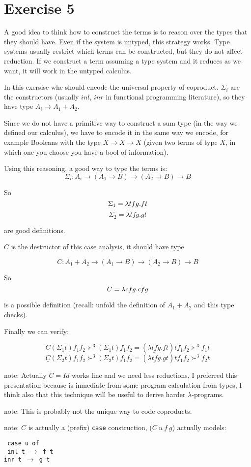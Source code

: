 
\section*{Exercise 5}

A good idea to think how to construct the terms is to reason over the
types that they should have. Even if the system is untyped, this
strategy works. Type systems usually restrict which terms can be constructed,
but they do not affect reduction. If we construct a term assuming a type
system and it reduces as we want, it will work in the untyped calculus.

In this exersise whe should encode the universal property of coproduct.
$\Sigma_i$ are the constructors (usually $inl$, $inr$ in functional
programming literature), so they have type $A_i \rightarrow A_1 + A_2$.

Since we do not have a primitive way to construct a sum type (in the way
we defined our calculus), we have to encode it in
the same way we encode, for example Booleans with the type
$ X \rightarrow X \rightarrow X$ (given two terms of type $X$,
in which one you choose you have a bool of information).

Using this reasoning, a good way to type the terms is:
$$\Sigma_i : A_i \rightarrow
            (A_1 \rightarrow B) \rightarrow
            (A_2 \rightarrow B) \rightarrow
            B
$$


So
$$
    \Sigma_1 = \lambda t f g . f t \\
$$
$$
    \Sigma_2 = \lambda t f g . g t
$$

are good definitions.

$C$ is the destructor of this case analysis, it should have type

$$
    C : A_1 + A_2 \rightarrow
       (A_1 \rightarrow B) \rightarrow
       (A_2 \rightarrow B) \rightarrow
       B
$$

So
$$
     C = \lambda c f g . c f g \\
$$

is a possible definition (recall: unfold the definition of $A_1 + A_2$
and this type checks).

Finally we can verify:

$$
    \underline{C} (\Sigma_1 t) f_1 f_2
    \succ^{3}  (\Sigma_1 t) f_1 f_2
    = (\underline{\lambda t f g} . f t) t f_1 f_2
    \succ^{3} f_1 t
$$
$$
    \underline{C} (\Sigma_2 t) f_1 f_2
    \succ^{3}  (\Sigma_2 t) f_1 f_2
    = (\underline{\lambda t f g} . g t) t f_1 f_2
    \succ^{3} f_2 t
$$

note: Actually $C = Id$ works fine and we need less reductions, I preferred
this presentation because is inmediate from some program calculation from
types, I think also that this technique will be useful to derive
harder $\lambda$-programs.

note: This is probably not the unique way to code coproducts.

note: $C$ is actually a (prefix) {\tt case} construction,
($C \: u \: f \: g$) actually models:

{\tt
  case u of\\
  {\setlength\parindent{24pt}
    \indent inl t  $\rightarrow$ f t\\
    \indent inr t  $\rightarrow$ g t
  }
}
